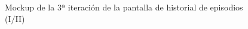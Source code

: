 \begin{figure}[H]
    \centering
    \begin{minipage}{.6\textwidth}
        \centering
        \caption[Mockup de la 3ª iteración de la pantalla de historial de episodios (I/II)]{Mockup de la 3ª iteración de la pantalla de historial de episodios (I/II)}
        \label{c4:fig:v3:android:14EpisodesHistory}
    \end{minipage}
\end{figure}

